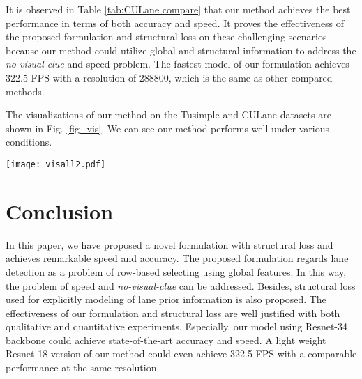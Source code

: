 \documentclass[runningheads]{llncs}
\begin{document}
It is observed in Table \ref{tab:CULane compare} that our method achieves the best performance  in terms of both accuracy and speed. It proves the effectiveness of the proposed formulation and structural loss on these challenging scenarios because our method could utilize global and structural information to address the \textit{no-visual-clue} and speed problem. The fastest model of our formulation achieves 322.5 FPS with a resolution of 288800, which is the same as other compared methods.

The visualizations of our method on the Tusimple and CULane datasets are shown in Fig. \ref{fig_vis}. We can see our method performs well under various conditions. \vspace{-5pt}
\begin{figure*}[t]

	\centering
	\texttt{[image: visall2.pdf]}
	\caption{Visualization on the Tusimple and the CULane dataset. The first two rows are results on the Tusimple dataset and the rest rows are results on the CULane dataset. From left to right, the results are image, prediction and label. In the image, predictions are marked in blue and ground truth are marked in red. Because our method only predicts on the predefined row anchors, the scales of images and labels in the vertical direction are not identical.}
	\label{fig_vis}
	\vspace{-15pt}
\end{figure*}

\section{Conclusion}



In this paper, we have proposed a novel formulation with structural loss and achieves remarkable speed and accuracy. The proposed formulation regards lane detection as a problem of row-based selecting using global features. In this way, the problem of speed and \textit{no-visual-clue} can be addressed. Besides, structural loss used for explicitly modeling of lane prior information is also proposed. The effectiveness of our formulation and structural loss are well justified with both qualitative and quantitative experiments. Especially, our model using Resnet-34 backbone could achieve state-of-the-art accuracy and speed. A light weight Resnet-18 version of our method could even achieve 322.5 FPS with a comparable performance at the same resolution.

\clearpage




\end{document}
